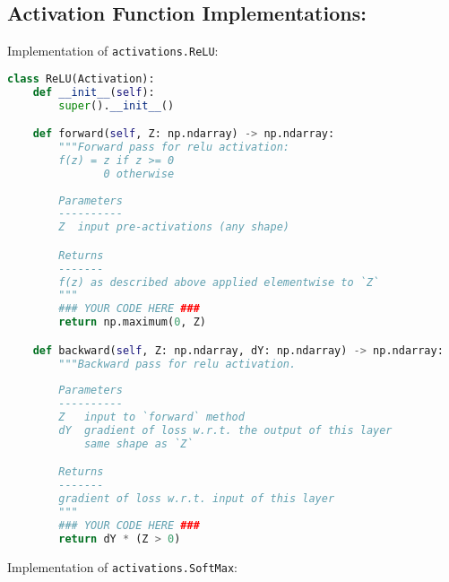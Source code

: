 \subsection{Activation Function Implementations:}

Implementation of \texttt{activations.ReLU}:

\begin{lstlisting}[language=Python]
class ReLU(Activation):
    def __init__(self):
        super().__init__()

    def forward(self, Z: np.ndarray) -> np.ndarray:
        """Forward pass for relu activation:
        f(z) = z if z >= 0
               0 otherwise
        
        Parameters
        ----------
        Z  input pre-activations (any shape)

        Returns
        -------
        f(z) as described above applied elementwise to `Z`
        """
        ### YOUR CODE HERE ###
        return np.maximum(0, Z)

    def backward(self, Z: np.ndarray, dY: np.ndarray) -> np.ndarray:
        """Backward pass for relu activation.
        
        Parameters
        ----------
        Z   input to `forward` method
        dY  gradient of loss w.r.t. the output of this layer
            same shape as `Z`

        Returns
        -------
        gradient of loss w.r.t. input of this layer
        """
        ### YOUR CODE HERE ###
        return dY * (Z > 0)

\end{lstlisting}

Implementation of \texttt{activations.SoftMax}:

